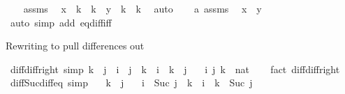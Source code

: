 \begin{isabellebody}
\ \ \isamarkupfalse%
\ assms\ \isamarkupfalse%
\ {\isachardoublequoteopen}x\ {\isacharminus}{\kern0pt}\ k\ {\isacharplus}{\kern0pt}\ k\ {\isacharequal}{\kern0pt}\ y\ {\isacharminus}{\kern0pt}\ k\ {\isacharplus}{\kern0pt}\ k{\isachardoublequoteclose}\ \isamarkupfalse%
\ auto\isanewline
\ \ \isamarkupfalse%
\ a\ assms\ \isamarkupfalse%
\ {\isachardoublequoteopen}x\ {\isacharequal}{\kern0pt}\ y{\isachardoublequoteclose}\ \isamarkupfalse%
\ {\isacharparenleft}{\kern0pt}auto\ simp\ add{\isacharcolon}{\kern0pt}\ eq{\isacharunderscore}{\kern0pt}diff{\isacharunderscore}{\kern0pt}iff{\isacharparenright}{\kern0pt}\isanewline
{}\isamarkupfalse%
%
\endisatagproof
{\isafoldproof}%
%
\isadelimproof
%
\endisadelimproof
%
\begin{isamarkuptext}%
Rewriting to pull differences out%
\end{isamarkuptext}\isamarkuptrue%
\isamarkupfalse%
\ diff{\isacharunderscore}{\kern0pt}diff{\isacharunderscore}{\kern0pt}right\ {\isacharbrackleft}{\kern0pt}simp{\isacharbrackright}{\kern0pt}{\isacharcolon}{\kern0pt}\ {\isachardoublequoteopen}k\ {\isasymle}\ j\ {\isasymLongrightarrow}\ i\ {\isacharminus}{\kern0pt}\ {\isacharparenleft}{\kern0pt}j\ {\isacharminus}{\kern0pt}\ k{\isacharparenright}{\kern0pt}\ {\isacharequal}{\kern0pt}\ i\ {\isacharplus}{\kern0pt}\ k\ {\isacharminus}{\kern0pt}\ j{\isachardoublequoteclose}\isanewline
\ \ \ i\ j\ k\ {\isacharcolon}{\kern0pt}{\isacharcolon}{\kern0pt}\ nat\isanewline
%
\isadelimproof
\ \ %
\endisadelimproof
%
\isatagproof
{}\isamarkupfalse%
\ {\isacharparenleft}{\kern0pt}fact\ diff{\isacharunderscore}{\kern0pt}diff{\isacharunderscore}{\kern0pt}right{\isacharparenright}{\kern0pt}%
\endisatagproof
{\isafoldproof}%
%
\isadelimproof
\isanewline
%
\endisadelimproof
\isanewline
{}\isamarkupfalse%
\ diff{\isacharunderscore}{\kern0pt}Suc{\isacharunderscore}{\kern0pt}diff{\isacharunderscore}{\kern0pt}eq{}\ {\isacharbrackleft}{\kern0pt}simp{\isacharbrackright}{\kern0pt}{\isacharcolon}{\kern0pt}\isanewline
\ \ \ {\isachardoublequoteopen}k\ {\isasymle}\ j{\isachardoublequoteclose}\isanewline
\ \ \ {\isachardoublequoteopen}i\ {\isacharminus}{\kern0pt}\ Suc\ {\isacharparenleft}{\kern0pt}j\ {\isacharminus}{\kern0pt}\ k{\isacharparenright}{\kern0pt}\ {\isacharequal}{\kern0pt}\ i\ {\isacharplus}{\kern0pt}\ k\ {\isacharminus}{\kern0pt}\ Suc\ j{\isachardoublequoteclose}\isanewline

\end{isabellebody}

